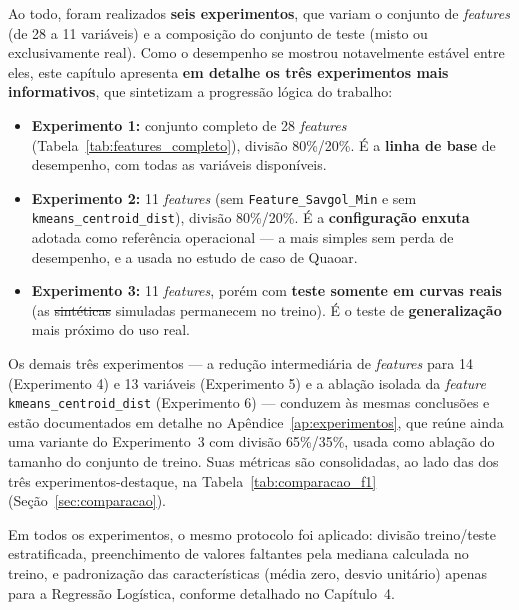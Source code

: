 \documentclass[msc]{on} %
\makeatletter
\providecommand{\DIFaddtex}[1]{{\protect\color{red}#1}} %
\providecommand{\DIFdeltex}[1]{{\protect\color{red}\sout{#1}}} %
\providecommand{\DIFaddbegin}{} %
\providecommand{\DIFaddend}{} %
\providecommand{\DIFdelbegin}{} %
\providecommand{\DIFdelend}{} %
\providecommand{\DIFadd}[1]{\texorpdfstring{\DIFaddtex{#1}}{#1}} %
\providecommand{\DIFdel}[1]{\texorpdfstring{\DIFdeltex{#1}}{}} %
\let\sout@orig\sout %
\renewcommand{\sout}[1]{\ifmmode\text{\sout@orig{\ensuremath{#1}}}\else\sout@orig{#1}\fi} %
\makeatother
\begin{document}
Ao todo, foram realizados \textbf{seis experimentos}, que variam o conjunto de \textit{features} (de 28 a 11 variáveis) e a composição do conjunto de teste (misto ou exclusivamente real). Como o desempenho se mostrou notavelmente estável entre eles, este capítulo apresenta \textbf{em detalhe os três experimentos mais informativos}, que sintetizam a progressão lógica do trabalho:

\begin{itemize}
	\item \textbf{Experimento 1:} conjunto completo de 28 \textit{features} \DIFaddbegin \DIFadd{(Tabela~\ref{tab:features_completo})}\DIFaddend , divisão 80\%/20\%. É a \textbf{linha de base} de desempenho, com todas as variáveis disponíveis.
	\item \textbf{Experimento 2:} 11 \textit{features} (sem \texttt{Feature\_Savgol\_Min} e sem \texttt{kmeans\_centroid\_dist}), divisão 80\%/20\%. É a \textbf{configuração enxuta} adotada como referência operacional --- a mais simples sem perda de desempenho, e a usada no estudo de caso de Quaoar.
	\item \textbf{Experimento 3:} 11 \textit{features}, porém com \textbf{teste somente em curvas reais} (as \DIFdelbegin \DIFdel{sintéticas }\DIFdelend \DIFaddbegin \DIFadd{simuladas }\DIFaddend permanecem no treino). É o teste de \textbf{generalização} mais próximo do uso real.
\end{itemize}

Os demais três experimentos --- a redução intermediária de \textit{features} para 14 (Experimento 4) e 13 variáveis (Experimento 5) e a ablação isolada da \textit{feature} \texttt{kmeans\_centroid\_dist} (Experimento 6) --- conduzem às mesmas conclusões e estão documentados em detalhe no Apêndice~\ref{ap:experimentos}, que reúne ainda uma variante do Experimento~3 com divisão 65\%/35\%, usada como ablação do tamanho do conjunto de treino. Suas métricas são consolidadas, ao lado das dos três experimentos-destaque, na Tabela~\ref{tab:comparacao_f1} (Seção~\ref{sec:comparacao}).

Em todos os experimentos, o mesmo protocolo foi aplicado: divisão treino/teste estratificada, preenchimento de valores faltantes pela mediana calculada no treino, e padronização das características (média zero, desvio unitário) apenas para a Regressão Logística, conforme detalhado no Capítulo~4.
\end{document}
